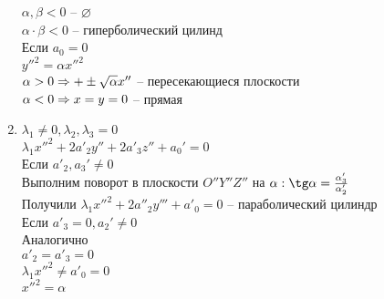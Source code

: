 \documentclass[12pt]{article}
\begin{document}
\begin{enumerate}
    $\alpha, \beta < 0$ -- $\varnothing$\\
    $\alpha\cdot\beta < 0$ -- гиперболический цилинд\\
    Если $a_0 = 0$\\
    $y''^2 = \alpha x''^2$\\
    $\alpha > 0 \Rightarrow +\pm \sqrt{\alpha} x''$ -- пересекающиеся плоскости\\
    $\alpha < 0 \Rightarrow x=y=0$ -- прямая
    \item $\lambda_1 \neq 0, \lambda_2, \lambda_3 = 0$\\
    $\lambda_1 x''^2 + 2a'_2 y'' + 2a'_3 z'' + a_0' = 0$\\
    Если $a'_2, a_3' \neq 0$\\
    Выполним поворот в плоскости $O''Y''Z''$ на $\alpha: \tg \alpha = \frac{\alpha'_3}{\alpha'_2}$\\
    Получили $\lambda_1 x''^2 + 2a''_2y''' + a'_0 = 0$ -- параболический цилиндр\\
    Если $a'_3 = 0, a_2' \neq 0$\\
    Аналогично\\
    $a'_2 = a'_3 = 0$\\
    $\lambda_1 x''^2 \neq a'_0 = 0$\\
    $x''^2 = \alpha$
\end{enumerate}
\end{document}
